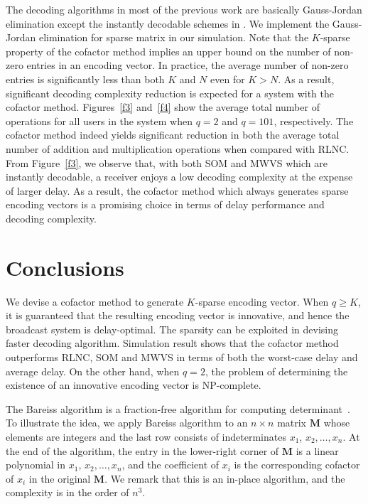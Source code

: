 \documentclass[letterpaper,conference,10pt]{IEEEtran}
\begin{document}
The decoding algorithms in most of the previous work are basically Gauss-Jordan elimination except the instantly decodable schemes in \cite{ID1, ID2}. We implement the Gauss-Jordan elimination for sparse matrix in our simulation. Note that the $K$-sparse property of the cofactor method implies an upper bound on the number of non-zero entries in an encoding vector. In practice, the average number of non-zero entries is significantly less than both $K$ and $N$ even for $K > N$. As a result, significant decoding complexity reduction is expected for a system with the cofactor method. Figures~\ref{f3} and~\ref{f4} show the average total number of operations for all users in the system when $q=2$ and $q=101$, respectively. The cofactor method indeed yields significant reduction in both the average total number of addition and multiplication operations when compared with RLNC. From Figure~\ref{f3}, we observe that, with both SOM and MWVS which are instantly decodable, a receiver enjoys a low decoding complexity at the expense of larger delay. As a result, the cofactor method which always generates sparse encoding vectors is a promising choice in terms of delay performance and decoding complexity.



\section{Conclusions}
We devise a cofactor method to generate $K$-sparse encoding vector. When $q\geq K$, it is guaranteed that the resulting encoding vector is innovative, and hence the broadcast system is delay-optimal.
The sparsity can be exploited in devising faster decoding algorithm. Simulation result shows that the cofactor method outperforms RLNC, SOM and MWVS in terms of both the worst-case delay and average delay. On the other hand, when $q=2$, the problem of determining the existence of an innovative encoding vector is NP-complete.





\appendix

\label{app}
The Bareiss algorithm is a fraction-free algorithm for computing determinant~\cite{Yap2000}. To illustrate the idea, we apply Bareiss algorithm to an $n \times n$ matrix $\mathbf{M}$ whose elements are integers and the last row consists of indeterminates $x_1$, $x_2, \ldots, x_n$. At the end of the algorithm, the entry in the lower-right corner of $\mathbf{M}$ is a linear polynomial in $x_1$, $x_2,\ldots, x_n$, and the coefficient of $x_i$ is the corresponding cofactor of $x_i$ in the original $\mathbf{M}$. We remark that this is an in-place algorithm, and the complexity is in the order of $n^3$.
\end{document}

